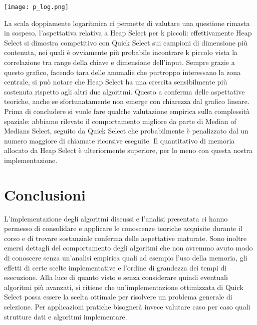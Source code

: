 \documentclass{article}
\begin{document}
\newpage
\begin{center}
\texttt{[image: p\_log.png]}
\end{center}
La scala doppiamente logaritmica ci permette di valutare una questione rimasta in sospeso, l'aspettativa relativa a Heap Select per k piccoli: effettivamente Heap Select si dimostra competitivo con Quick Select sui campioni di dimensione più contenuta, nei quali è ovviamente più probabile incontrare k piccolo vista la correlazione tra range della chiave e dimensione dell'input.
\newline
\newline
Sempre grazie a questo grafico, facendo tara delle anomalie che purtroppo interessano la zona centrale, si può notare che Heap Select ha una crescita sensibilmente più sostenuta rispetto agli altri due algoritmi.
\newline
Questo a conferma delle aspettative teoriche, anche se sfortunatamente non emerge con chiarezza dal grafico lineare.
\newline
\newline
Prima di concludere si vuole fare qualche valutazione empirica sulla complessità spaziale:
\newline
abbiamo rilevato il comportamento migliore da parte di Median of Medians Select, seguito da Quick Select che probabilmente è penalizzato dal un numero maggiore di chiamate ricorsive eseguite.
\newline
Il quantitativo di memoria allocato da Heap Select è ulteriormente superiore, per lo meno con questa nostra implementazione.

\newpage

\section{Conclusioni}
L'implementazione degli algoritmi discussi e l'analisi presentata ci hanno permesso di consolidare e applicare le conoscenze teoriche acquisite durante il corso e di trovare sostanziale conferma delle aspettative maturate.
\newline
\newline
Sono inoltre emersi dettagli del comportamento degli algoritmi che non avremmo avuto modo di conoscere senza un'analisi empirica quali ad esempio l'uso della memoria, gli effetti di certe scelte implementative e l'ordine di grandezza dei tempi di esecuzione.
\newline
\newline
Alla luce di quanto visto e senza considerare quindi eventuali algoritmi più avanzati, si ritiene che un'implementazione ottimizzata di Quick Select possa essere la scelta ottimale per risolvere un problema generale di selezione. Per applicazioni pratiche bisognerà invece valutare caso per caso quali strutture dati e algoritmi implementare.
\end{document}
